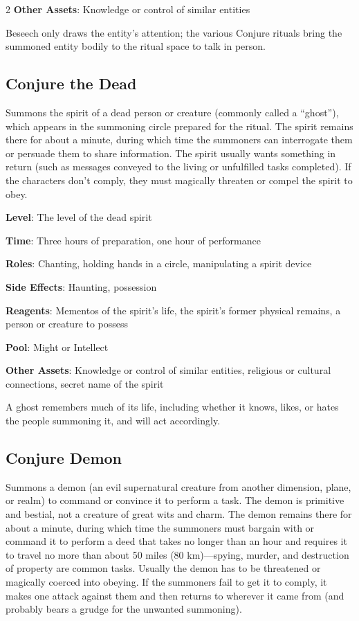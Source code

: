 \begin{multicols}{2}
\textbf{Other Assets}: Knowledge or control of similar entities

Beseech only draws the entity’s attention; the various Conjure rituals bring the summoned entity bodily to the ritual space to talk in person.

\subsection{Conjure the Dead}

Summons the spirit of a dead person or creature (commonly called a “ghost”), which appears in the summoning circle prepared for the ritual. The spirit remains there for about a minute, during which time the summoners can interrogate them or persuade them to share information. The spirit usually wants something in return (such as messages conveyed to the living or unfulfilled tasks completed). If the characters don’t comply, they must magically threaten or compel the spirit to obey. 

\textbf{Level}: The level of the dead spirit 

\textbf{Time}: Three hours of preparation, one hour of performance 

\textbf{Roles}: Chanting, holding hands in a circle, manipulating a spirit device 

\textbf{Side Effects}: Haunting, possession 

\textbf{Reagents}: Mementos of the spirit’s life, the spirit’s former physical remains, a person or creature to possess 

\textbf{Pool}: Might or Intellect 

\textbf{Other Assets}: Knowledge or control of similar entities, religious or cultural connections, secret name of the spirit 

A ghost remembers much of its life, including whether it knows, likes, or hates the people summoning it, and will act accordingly.

\subsection{Conjure Demon}

Summons a demon (an evil supernatural creature from another dimension, plane, or realm) to command or convince it to perform a task. The demon is primitive and bestial, not a creature of great wits and charm. The demon remains there for about a minute, during which time the summoners must bargain with or command it to perform a deed that takes no longer than an hour and requires it to travel no more than about 50 miles (80 km)—spying, murder, and destruction of property are common tasks. Usually the demon has to be threatened or magically coerced into obeying. If the summoners fail to get it to comply, it makes one attack against them and then returns to wherever it came from (and probably bears a grudge for the unwanted summoning). 


\end{multicols}
